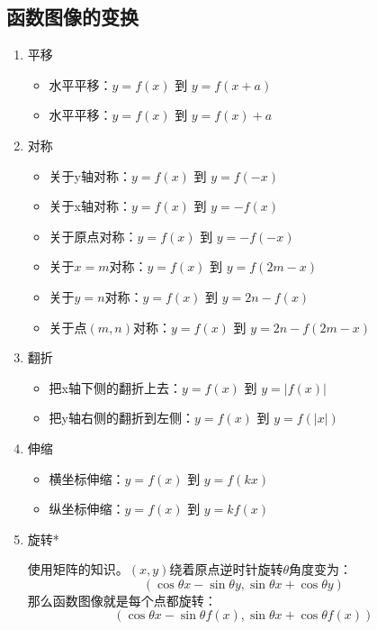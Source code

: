 \subsection{函数图像的变换}\label{transform}
\begin{enumerate}
    \item 平移
          \begin{itemize}
              \item 水平平移：$y = f(x)$ 到 $y = f(x+a)$
              \item 水平平移：$y = f(x)$ 到 $y = f(x) + a$
          \end{itemize}
    \item 对称
          \begin{itemize}
              \item 关于y轴对称：$y = f(x)$ 到 $y = f(-x)$
              \item 关于x轴对称：$y = f(x)$ 到 $y = -f(x)$
              \item 关于原点对称：$y = f(x)$ 到 $y = -f(-x)$
              \item 关于$x=m$对称：$y = f(x)$ 到 $y = f(2m-x)$
              \item 关于$y=n$对称：$y = f(x)$ 到 $y = 2n-f(x)$
              \item 关于点$(m,n)$对称：$y = f(x)$ 到 $y = 2n-f(2m-x)$
          \end{itemize}
    \item 翻折
          \begin{itemize}
              \item 把x轴下侧的翻折上去：$y = f(x)$ 到 $y = |f(x)|$
              \item 把y轴右侧的翻折到左侧：$y = f(x)$ 到 $y = f(|x|)$
          \end{itemize}
    \item 伸缩
          \begin{itemize}
              \item 横坐标伸缩：$y = f(x)$ 到 $y = f(kx)$
              \item 纵坐标伸缩：$y = f(x)$ 到 $y = kf(x)$
          \end{itemize}
    \item 旋转*

          使用矩阵的知识。$(x,y)$绕着原点逆时针旋转$\theta$角度变为：
          $$
              (\cos\theta x- \sin\theta y, \sin\theta x+ \cos\theta y)
          $$
          那么函数图像就是每个点都旋转：
          $$
              (\cos\theta x- \sin\theta f(x), \sin\theta x+ \cos\theta f(x))
          $$
\end{enumerate}
